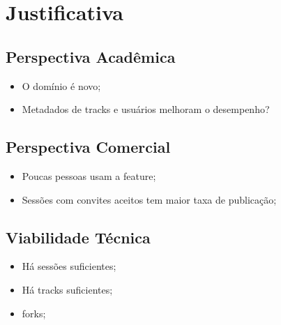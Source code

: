 \section{Justificativa}
\subsection{Perspectiva Acadêmica}
\begin{itemize}
    \item O domínio é novo;
    \item Metadados de tracks e usuários melhoram o desempenho?
\end{itemize}
\subsection{Perspectiva Comercial}
\begin{itemize}
    \item Poucas pessoas usam a feature;
    \item Sessões com convites aceitos tem maior taxa de publicação;
\end{itemize}
\subsection{Viabilidade Técnica}
\begin{itemize}
    \item Há sessões suficientes;
    \item Há tracks suficientes;
    \item forks;
\end{itemize}
\vspace{0.4cm}